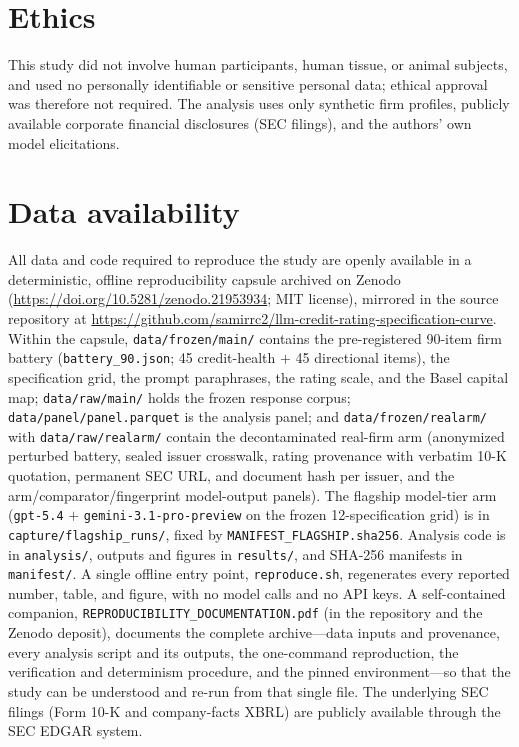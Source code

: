 \documentclass[a4paper,fleqn]{cas-sc}
\begin{document}
\section*{Ethics}
This study did not involve human participants, human tissue, or animal subjects, and used no personally
identifiable or sensitive personal data; ethical approval was therefore not required. The analysis uses
only synthetic firm profiles, publicly available corporate financial disclosures (SEC filings), and the
authors' own model elicitations.

\section*{Data availability}
All data and code required to reproduce the study are openly available in a deterministic, offline
reproducibility capsule archived on Zenodo \citep{chincholikar2026capsule}
(\url{https://doi.org/10.5281/zenodo.21953934}; MIT license), mirrored in the source repository at
\url{https://github.com/samirrc2/llm-credit-rating-specification-curve}.
Within the capsule, \texttt{data/frozen/main/} contains the pre-registered 90-item firm battery
(\texttt{battery\_90.json}; 45 credit-health $+$ 45 directional items), the specification grid, the prompt
paraphrases, the rating scale, and the Basel capital map; \texttt{data/raw/main/} holds the frozen
response corpus; \texttt{data/panel/panel.parquet} is the analysis panel; and
\texttt{data/frozen/realarm/} with \texttt{data/raw/realarm/} contain the decontaminated real-firm arm
(anonymized perturbed battery, sealed issuer crosswalk, rating provenance with verbatim 10-K quotation,
permanent SEC URL, and document hash per issuer, and the arm/comparator/fingerprint model-output panels).
The flagship model-tier arm (\texttt{gpt-5.4} $+$ \texttt{gemini-3.1-pro-preview} on the frozen
12-specification grid) is in \texttt{capture/flagship\_runs/}, fixed by \texttt{MANIFEST\_FLAGSHIP.sha256}.
Analysis code is in \texttt{analysis/}, outputs and figures in \texttt{results/}, and SHA-256 manifests in
\texttt{manifest/}. A single offline entry point, \texttt{reproduce.sh}, regenerates every reported
number, table, and figure, with no model calls and no API keys. A self-contained companion,
\texttt{REPRODUCIBILITY\_DOCUMENTATION.pdf} (in the repository and the Zenodo deposit), documents the
complete archive---data inputs and provenance, every analysis script and its outputs, the one-command
reproduction, the verification and determinism procedure, and the pinned environment---so that the study
can be understood and re-run from that single file. The underlying SEC filings (Form 10-K and
company-facts XBRL) are publicly available through the SEC EDGAR system.



\end{document}
